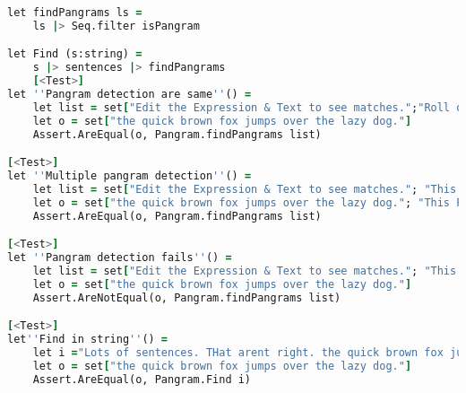 \begin{lstlisting}[language=F]
let findPangrams ls =
    ls |> Seq.filter isPangram

let Find (s:string) =
    s |> sentences |> findPangrams
    [<Test>]
let ''Pangram detection are same''() =
    let list = set["Edit the Expression & Text to see matches.";"Roll over matches or the expression for details."; "Undo mistakes with cmd-z."; "Save Favorites & Share expressions with friends or the Community."; "Explore your results with Tools."; "the quick brown fox jumps over the lazy dog."; "A full Reference & Help is available in the Library, or watch the video Tutorial."]
    let o = set["the quick brown fox jumps over the lazy dog."]
    Assert.AreEqual(o, Pangram.findPangrams list)

[<Test>]
let ''Multiple pangram detection''() =
    let list = set["Edit the Expression & Text to see matches."; "This Pangram contains four a’s, one b, two c’s, one d, thirty e’s, six f’s, five g’s, seven h’s, eleven i’s, one j, one k, two l’s, two m’s, eighteen n’s, fifteen o’s, two p’s, one q, five r’s, twenty-seven s’s, eighteen t’s, two u’s, seven v’s, eight w’s, two x’s, three y’s, & one z.";"Roll over matches or the expression for details."; "Undo mistakes with cmd-z."; "Save Favorites & Share expressions with friends or the Community."; "Explore your results with Tools."; "the quick brown fox jumps over the lazy dog."; "A full Reference & Help is available in the Library, or watch the video Tutorial."]
    let o = set["the quick brown fox jumps over the lazy dog."; "This Pangram contains four a’s, one b, two c’s, one d, thirty e’s, six f’s, five g’s, seven h’s, eleven i’s, one j, one k, two l’s, two m’s, eighteen n’s, fifteen o’s, two p’s, one q, five r’s, twenty-seven s’s, eighteen t’s, two u’s, seven v’s, eight w’s, two x’s, three y’s, & one z."]
    Assert.AreEqual(o, Pangram.findPangrams list)

[<Test>]
let ''Pangram detection fails''() =
    let list = set["Edit the Expression & Text to see matches."; "This Pangram contains four a’s, one b, two c’s, one d, thirty e’s, six f’s, five g’s, seven h’s, eleven i’s, one j, one k, two l’s, two m’s, eighteen n’s, fifteen o’s, two p’s, one q, five r’s, twenty-seven s’s, eighteen t’s, two u’s, seven v’s, eight w’s, two x’s, three y’s, & one z.";"Roll over matches or the expression for details."; "Undo mistakes with cmd-z."; "Save Favorites & Share expressions with friends or the Community."; "Explore your results with Tools."; "the quick brown fox jumps over the lazy dog."; "A full Reference & Help is available in the Library, or watch the video Tutorial."]
    let o = set["the quick brown fox jumps over the lazy dog."]
    Assert.AreNotEqual(o, Pangram.findPangrams list)

[<Test>]
let''Find in string''() =
    let i ="Lots of sentences. THat arent right. the quick brown fox jumps over the lazy dog. lalallala"
    let o = set["the quick brown fox jumps over the lazy dog."]
    Assert.AreEqual(o, Pangram.Find i)
\end{lstlisting}

